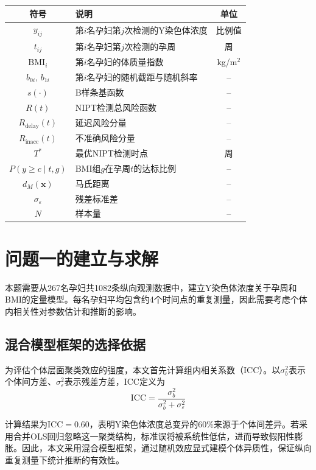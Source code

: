 \documentclass{cumcmthesis}
\begin{document}
\begin{table}[H]
\centering
\begin{tabular}{clc}
\toprule
符号 & 说明 & 单位 \\
\midrule
$y_{ij}$ & 第$i$名孕妇第$j$次检测的Y染色体浓度 & 比例值 \\
$t_{ij}$ & 第$i$名孕妇第$j$次检测的孕周 & 周 \\
$\mathrm{BMI}_i$ & 第$i$名孕妇的体质量指数 & kg/m$^2$ \\
$b_{0i},\, b_{1i}$ & 第$i$名孕妇的随机截距与随机斜率 & -- \\
$s(\cdot)$ & B样条基函数 & -- \\
$R(t)$ & NIPT检测总风险函数 & -- \\
$R_{\text{delay}}(t)$ & 延迟风险分量 & -- \\
$R_{\text{inacc}}(t)$ & 不准确风险分量 & -- \\
$T^*$ & 最优NIPT检测时点 & 周 \\
$P(y \geq c \mid t, g)$ & BMI组$g$在孕周$t$的达标比例 & -- \\
$d_M(\mathbf{x})$ & 马氏距离 & -- \\
$\sigma_\varepsilon$ & 残差标准差 & -- \\
$N$ & 样本量 & -- \\
\bottomrule
\end{tabular}
\end{table}

\section{问题一的建立与求解}

本题需要从267名孕妇共1082条纵向观测数据中，建立Y染色体浓度关于孕周和BMI的定量模型。每名孕妇平均包含约4个时间点的重复测量，因此需要考虑个体内相关性对参数估计和推断的影响。

\subsection{混合模型框架的选择依据}

为评估个体层面聚类效应的强度，本文首先计算组内相关系数（ICC）。以$\sigma^2_b$表示个体间方差、$\sigma^2_\varepsilon$表示残差方差，ICC定义为
\begin{equation}
  \mathrm{ICC} = \frac{\sigma^2_b}{\sigma^2_b + \sigma^2_\varepsilon}
\end{equation}

计算结果为$\mathrm{ICC}=0.60$，表明Y染色体浓度总变异的60\%来源于个体间差异。若采用合并OLS回归忽略这一聚类结构，标准误将被系统性低估，进而导致假阳性膨胀。因此，本文采用混合模型框架，通过随机效应显式建模个体异质性，保证纵向重复测量下统计推断的有效性。
\end{document}
